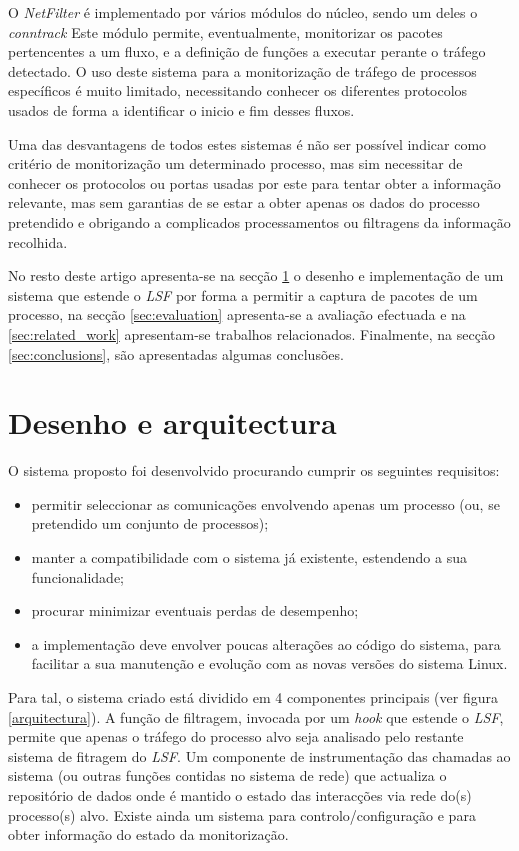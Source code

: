 \documentclass[a4paper]{llncs}
\begin{document}
O \textit{NetFilter} é implementado por vários módulos do núcleo, sendo um deles o \textit{conntrack}%
 Este módulo permite, eventualmente, monitorizar os pacotes pertencentes a um fluxo, e a definição de funções a executar perante o tráfego detectado.
 O uso deste sistema para a monitorização de tráfego de processos específicos é muito limitado, necessitando conhecer os diferentes protocolos usados de forma a identificar o inicio e fim desses fluxos. 

Uma das desvantagens de todos estes sistemas é não ser possível indicar como critério de monitorização um determinado processo, mas sim necessitar de conhecer os protocolos ou portas usadas por este para tentar obter a informação relevante, mas sem garantias de se estar a obter apenas os dados do processo pretendido e obrigando a complicados processamentos ou filtragens da informação recolhida.

No resto deste artigo apresenta-se na secção \ref{sec:architecture} o desenho e implementação de um sistema que estende o \textit{LSF} por forma a permitir a captura de pacotes de um processo, na secção \ref{sec:evaluation} apresenta-se a avaliação efectuada e na \ref{sec:related_work} apresentam-se trabalhos relacionados.
 Finalmente, na secção \ref{sec:conclusions}, são apresentadas algumas conclusões.

\section{Desenho e arquitectura}
\label{sec:architecture}

O sistema proposto foi desenvolvido procurando cumprir os seguintes requisitos:
\begin{itemize}
\item permitir seleccionar as comunicações envolvendo apenas um processo (ou, se pretendido um conjunto de processos);
\item manter a compatibilidade com o sistema já existente, estendendo a sua funcionalidade;
\item procurar minimizar eventuais perdas de desempenho;
\item a implementação deve envolver poucas alterações ao código do sistema, para facilitar a sua manutenção e evolução com as novas versões do sistema Linux.
\end{itemize}

Para tal, o sistema criado está dividido em 4 componentes principais (ver figura \ref{arquitectura}).
 A função de filtragem, invocada por um \textit{hook} que estende o \textit{LSF}, permite que apenas o tráfego do processo alvo seja analisado pelo restante sistema de fitragem do \textit{LSF}.
 Um componente de instrumentação das chamadas ao sistema (ou outras funções contidas no sistema de rede) que actualiza o repositório de dados onde é mantido o estado das interacções via rede do(s) processo(s) alvo. Existe ainda um sistema para controlo/configuração e para obter informação do estado da monitorização.
\end{document}
